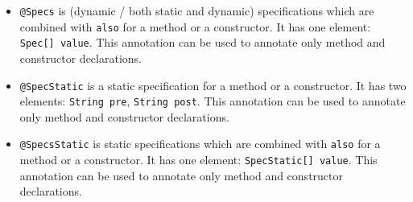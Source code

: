 \documentclass{article}
\begin{document}
\begin{itemize}
\item \texttt{@Specs} is (dynamic / both static and dynamic) specifications which are combined with \texttt{also} for a method or a constructor. It has one element: \texttt{Spec[] value}. This annotation can be used to annotate only method and constructor declarations.
\item \texttt{@SpecStatic} is a static specification for a method or a constructor. It has two elements: \texttt{String pre}, \texttt{String post}. This annotation can be used to annotate only method and constructor declarations.
\item \texttt{@SpecsStatic} is static specifications which are combined with \texttt{also} for a method or a constructor. It has one element: \texttt{SpecStatic[] value}. This annotation can be used to annotate only method and constructor declarations.
\end{itemize}
\end{document}
